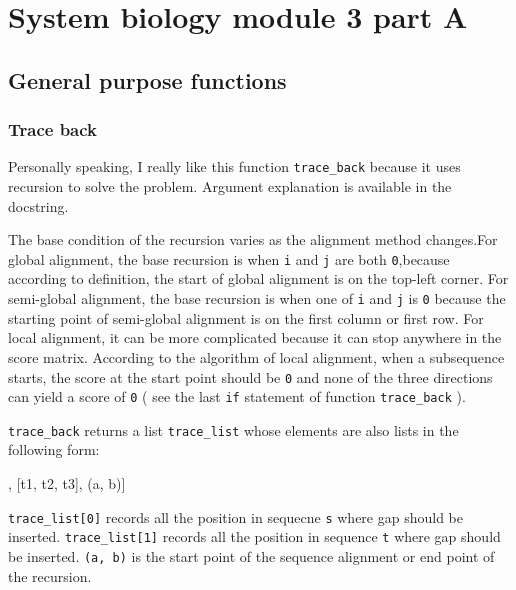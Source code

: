 \documentclass[]{article}
\date{}
\newenvironment{Shaded}{}{}
\newcommand{\NormalTok}[1]{#1}
\begin{document}
\hypertarget{header-n3}{%
\section{System biology module 3 part A}\label{header-n3}}

\hypertarget{header-n5}{%
\subsection{General purpose functions}\label{header-n5}}

\hypertarget{header-n6}{%
\subsubsection{Trace back}\label{header-n6}}

Personally speaking, I really like this function \texttt{trace\_back}
because it uses recursion to solve the problem. Argument explanation is
available in the docstring.

The base condition of the recursion varies as the alignment method
changes.For global alignment, the base recursion is when \texttt{i} and
\texttt{j} are both \texttt{0},because according to definition, the
start of global alignment is on the top-left corner. For semi-global
alignment, the base recursion is when one of \texttt{i} and \texttt{j}
is \texttt{0} because the starting point of semi-global alignment is on
the first column or first row. For local alignment, it can be more
complicated because it can stop anywhere in the score matrix. According
to the algorithm of local alignment, when a subsequence starts, the
score at the start point should be \texttt{0} and none of the three
directions can yield a score of \texttt{0} ( see the last \texttt{if}
statement of function \texttt{trace\_back} ).

\texttt{trace\_back} returns a list \texttt{trace\_list} whose elements
are also lists in the following form:

\begin{Shaded}
\begin{Highlighting}[]
\NormalTok{[[s0, s1, s2, s3], [t1, t2, t3], (a, b)]}
\end{Highlighting}
\end{Shaded}

\texttt{trace\_list{[}0{]}} records all the position in sequecne
\texttt{s} where gap should be inserted. \texttt{trace\_list{[}1{]}}
records all the position in sequence \texttt{t} where gap should be
inserted. \texttt{(a,\ b)} is the start point of the sequence alignment
or end point of the recursion.
\end{document}
